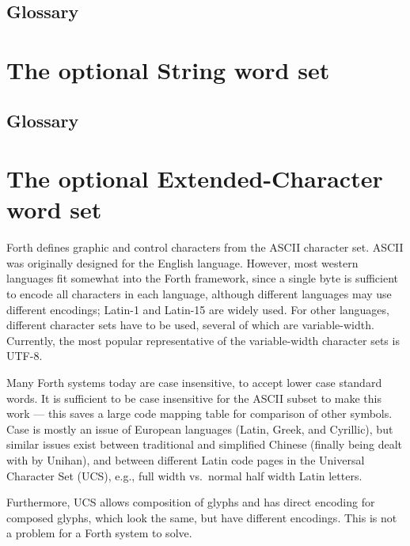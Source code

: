 \setcounter{subsection}{5}
\subsection{Glossary} %


\section{The optional String word set} %
\label{rat:string}


\setcounter{subsection}{5}
\subsection{Glossary} %



\section{The optional Extended-Character word set} %
\label{rat:xchar}

Forth defines graphic and control characters from the ASCII character
set.  ASCII was originally designed for the English language.
However, most western languages fit somewhat into the Forth framework,
since a single byte is sufficient to encode all characters in each
language, although different languages may use different encodings;
Latin-1 and Latin-15 are widely used.  For other languages, different
character sets have to be used, several of which are variable-width.
Currently, the most popular representative of the variable-width
character sets is UTF-8.

Many Forth systems today are case insensitive, to accept lower case
standard words.  It is sufficient to be case insensitive for the ASCII
subset to make this work --- this saves a large code mapping table for
comparison of other symbols.  Case is mostly an issue of European
languages (Latin, Greek, and Cyrillic), but similar issues exist
between traditional and simplified Chinese (finally being dealt with
by Unihan), and between different Latin code pages in the Universal
Character Set (UCS), e.g., full width vs.\ normal half width Latin
letters.

Furthermore, UCS allows composition of glyphs and has direct encoding for
composed glyphs, which look the same, but have different encodings.  This
is not a problem for a Forth system to solve.

